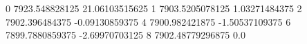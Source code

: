 0 7923.548828125 21.06103515625
1 7903.5205078125 1.03271484375
2 7902.396484375 -0.09130859375
4 7900.982421875 -1.50537109375
6 7899.7880859375 -2.69970703125
8 7902.48779296875 0.0
